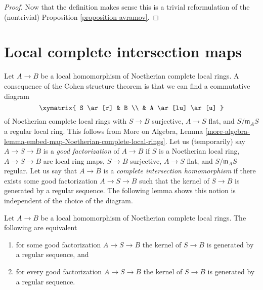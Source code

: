 \begin{proof}
Now that the definition makes sense this is a trivial reformulation
of the (nontrivial) Proposition \ref{proposition-avramov}.
\end{proof}









\section{Local complete intersection maps}
\label{section-lci-homomorphisms}

\noindent
Let $A \to B$ be a local homomorphism of Noetherian complete local rings.
A consequence of the Cohen structure theorem is that we can find a
commutative diagram
$$
\xymatrix{
S \ar[r] & B \\
& A \ar[lu] \ar[u]
}
$$
of Noetherian complete local rings with
$S \to B$ surjective, $A \to S$ flat, and
$S/\mathfrak m_A S$ a regular local ring. This follows from
More on Algebra, Lemma
\ref{more-algebra-lemma-embed-map-Noetherian-complete-local-rings}.
Let us (temporarily) say $A \to S \to B$ is a {\it good factorization}
of $A \to B$ if $S$ is a Noetherian local ring,
$A \to S \to B$ are local ring maps,
$S \to B$ surjective, $A \to S$ flat, and $S/\mathfrak m_AS$ regular.
Let us say that $A \to B$ is a
{\it complete intersection homomorphism}
if there exists some good factorization $A \to S \to B$
such that the kernel of $S \to B$ is generated by a regular sequence.
The following lemma shows this notion is independent of
the choice of the diagram.

\begin{lemma}
\label{lemma-ci-map-well-defined}
Let $A \to B$ be a local homomorphism of Noetherian complete local rings.
The following are equivalent
\begin{enumerate}
\item for some good factorization $A \to S \to B$ the kernel of
$S \to B$ is generated by a regular sequence, and
\item for every good factorization $A \to S \to B$ the kernel of
$S \to B$ is generated by a regular sequence.
\end{enumerate}
\end{lemma}

